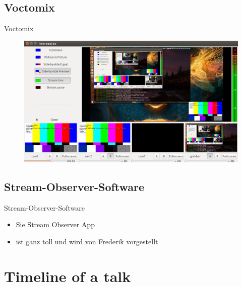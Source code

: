 \documentclass[hyperref={pdfpagelabels=false}]{beamer}
\begin{document}
\subsection{Voctomix} %
\begin{frame}{Voctomix}
	\begin{figure} 
		\centering
		\includegraphics[width=1\textwidth]{voctomix.png}
	\end{figure}
\end{frame}


\subsection{Stream-Observer-Software} %
\begin{frame}{Stream-Observer-Software}
\begin{itemize}
\item Sie Stream Observer App 
\item ist ganz toll und wird von Frederik vorgestellt
\end{itemize}
\end{frame}

\section{Timeline of a talk}  %
\end{document}

